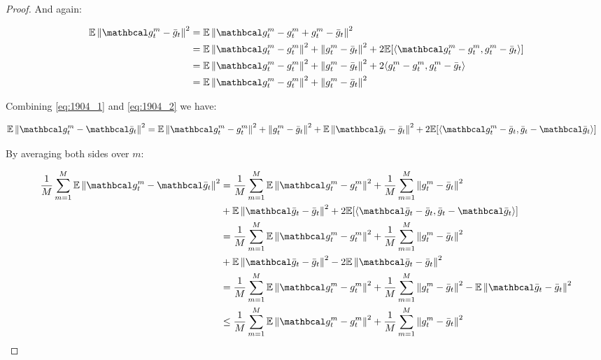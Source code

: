 \begin{proof}
    And again:

    \begin{align}
        \E \norm{\mc{g}^m_t - \bar{g}_t}^2 
        &= \E \norm{\mc{g}^m_t - g^m_t + g^m_t - \bar{g}_t}^2 \\
        &= \E \norm{\mc{g}^m_t - g^m_t}^2 
        + \norm{g^m_t - \bar{g}_t}^2
        + 2\E[\inner{\mc{g}^m_t - g^m_t}{g^m_t - \bar{g}_t}] \\
        &= \E \norm{\mc{g}^m_t - g^m_t}^2 
        + \norm{g^m_t - \bar{g}_t}^2
        + 2 \inner{g^m_t - g^m_t}{g^m_t - \bar{g}_t} \\
        &= \E \norm{\mc{g}^m_t - g^m_t}^2 
        + \norm{g^m_t - \bar{g}_t}^2 \label{eq:1904_2}
    \end{align}

    Combining \eqref{eq:1904_1} and \eqref{eq:1904_2} we have:

    \begin{align}
        \E \norm{\mc{g}^m_t - \mc{\bar{g}}_t}^2
        &= \E \norm{\mc{g}^m_t - g^m_t}^2 
        + \norm{g^m_t - \bar{g}_t}^2 + \E \norm{\mc{\bar{g}}_t - \bar{g}_t}^2 + 2\E [\inner{\mc{g}^m_t - \bar{g}_t}{\bar{g}_t - \mc{\bar{g}}_t}]
    \end{align}

    By averaging both sides over $m$:

    \begin{align}
        \fsumm{m=1}{M} \E \norm{\mc{g}^m_t - \mc{\bar{g}}_t}^2
        &= \fsumm{m=1}{M} \E \norm{\mc{g}^m_t - g^m_t}^2 
        + \fsumm{m=1}{M} \norm{g^m_t - \bar{g}_t}^2 \\
        &+ \E \norm{\mc{\bar{g}}_t - \bar{g}_t}^2 
        + 2\E [\inner{\mc{\bar{g}}_t - \bar{g}_t}{\bar{g}_t - \mc{\bar{g}}_t}] \\
        &= \fsumm{m=1}{M} \E \norm{\mc{g}^m_t - g^m_t}^2 
        + \fsumm{m=1}{M} \norm{g^m_t - \bar{g}_t}^2 \\
        &+ \E \norm{\mc{\bar{g}}_t - \bar{g}_t}^2 
        - 2\E \norm{\mc{\bar{g}}_t - \bar{g}_t}^2 \\
        &= \fsumm{m=1}{M} \E \norm{\mc{g}^m_t - g^m_t}^2 
        + \fsumm{m=1}{M} \norm{g^m_t - \bar{g}_t}^2
        - \E \norm{\mc{\bar{g}}_t - \bar{g}_t}^2 \\
        &\leq \fsumm{m=1}{M} \E \norm{\mc{g}^m_t - g^m_t}^2 
        + \fsumm{m=1}{M} \norm{g^m_t - \bar{g}_t}^2 \label{eq:1904_3}
    \end{align}


\end{proof}
